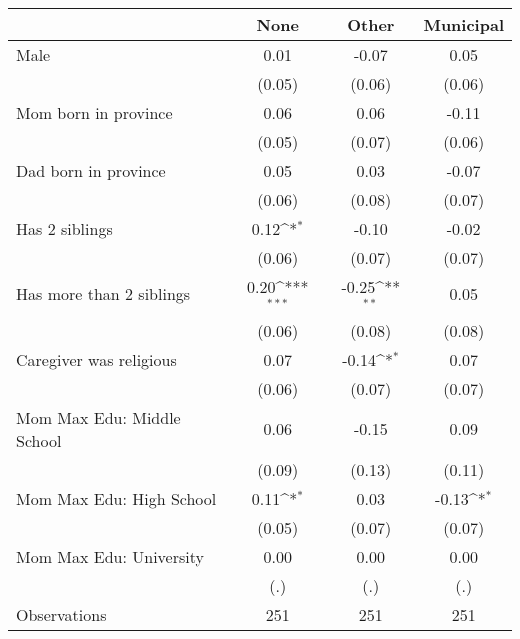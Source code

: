 {
\def\sym#1{\ifmmode^{#1}\else\(^{#1}\)\fi}
\begin{tabular}{l*{3}{c}}
\toprule
                    &\multicolumn{1}{c}{None}&\multicolumn{1}{c}{Other}&\multicolumn{1}{c}{Municipal}\\
\midrule
Male                &        0.01         &       -0.07         &        0.05         \\
                    &      (0.05)         &      (0.06)         &      (0.06)         \\
\addlinespace
Mom born in province&        0.06         &        0.06         &       -0.11         \\
                    &      (0.05)         &      (0.07)         &      (0.06)         \\
\addlinespace
Dad born in province&        0.05         &        0.03         &       -0.07         \\
                    &      (0.06)         &      (0.08)         &      (0.07)         \\
\addlinespace
Has 2 siblings      &        0.12\sym{*}  &       -0.10         &       -0.02         \\
                    &      (0.06)         &      (0.07)         &      (0.07)         \\
\addlinespace
Has more than 2 siblings&        0.20\sym{***}&       -0.25\sym{**} &        0.05         \\
                    &      (0.06)         &      (0.08)         &      (0.08)         \\
\addlinespace
Caregiver was religious&        0.07         &       -0.14\sym{*}  &        0.07         \\
                    &      (0.06)         &      (0.07)         &      (0.07)         \\
\addlinespace
Mom Max Edu: Middle School&        0.06         &       -0.15         &        0.09         \\
                    &      (0.09)         &      (0.13)         &      (0.11)         \\
\addlinespace
Mom Max Edu: High School&        0.11\sym{*}  &        0.03         &       -0.13\sym{*}  \\
                    &      (0.05)         &      (0.07)         &      (0.07)         \\
\addlinespace
Mom Max Edu: University&        0.00         &        0.00         &        0.00         \\
                    &         (.)         &         (.)         &         (.)         \\
\midrule
Observations        &         251         &         251         &         251         \\
\bottomrule
\end{tabular}
}
